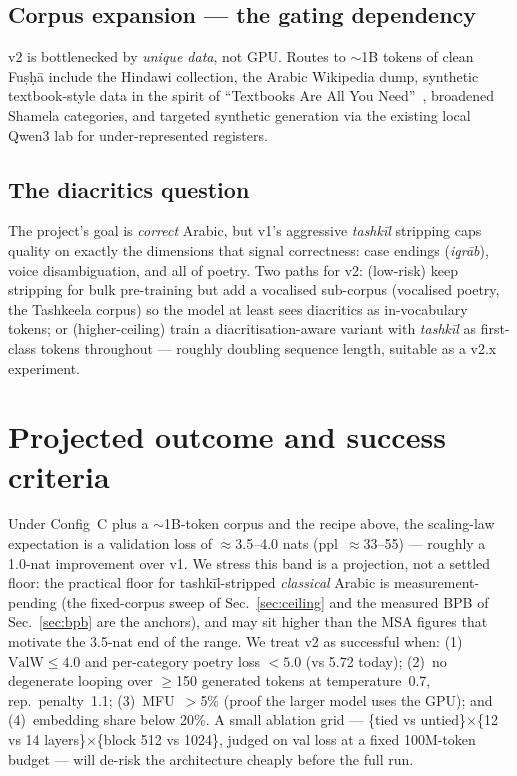 \documentclass[10pt,twocolumn]{article}
\begin{document}
\subsection{Corpus expansion --- the gating dependency}
v2 is bottlenecked by \emph{unique data}, not GPU. Routes to $\sim$1B tokens of
clean Fu\d{s}\d{h}\=a include the Hindawi collection, the Arabic Wikipedia dump,
synthetic textbook-style data in the spirit of ``Textbooks Are All You
Need''~\cite{textbooks}, broadened Shamela categories, and targeted synthetic
generation via the existing local Qwen3 lab for under-represented registers.

\subsection{The diacritics question}
\label{sec:diacritics}
The project's goal is \emph{correct} Arabic, but v1's aggressive
\emph{tashk\=il} stripping caps quality on exactly the dimensions that signal
correctness: case endings (\emph{i\d{q}r\=ab}), voice disambiguation, and all of
poetry. Two paths for v2: (low-risk) keep stripping for bulk pre-training but add
a vocalised sub-corpus (vocalised poetry, the Tashkeela corpus) so the model at
least sees diacritics as in-vocabulary tokens; or (higher-ceiling) train a
diacritisation-aware variant with \emph{tashk\=il} as first-class tokens
throughout --- roughly doubling sequence length, suitable as a v2.x experiment.

\section{Projected outcome and success criteria}
Under Config~C plus a $\sim$1B-token corpus and the recipe above, the scaling-law
expectation is a validation loss of $\approx$3.5--4.0 nats (ppl~$\approx$33--55)
--- roughly a 1.0-nat improvement over v1. We stress this band is a projection, not a
settled floor: the practical floor for tashk\=il-stripped \emph{classical} Arabic is
measurement-pending (the fixed-corpus sweep of Sec.~\ref{sec:ceiling} and the measured
BPB of Sec.~\ref{sec:bpb} are the anchors), and may sit higher than the MSA figures
that motivate the 3.5-nat end of the range. We treat v2 as successful when:
(1)~$\text{ValW}\leq4.0$ and per-category poetry loss $<5.0$ (vs 5.72 today);
(2)~no degenerate looping over $\geq$150 generated tokens at temperature~0.7,
rep.\ penalty~1.1; (3)~MFU~$>$5\% (proof the larger model uses the GPU); and
(4)~embedding share below 20\%. A small ablation grid ---
\{tied vs untied\}$\times$\{12 vs 14 layers\}$\times$\{block 512 vs 1024\},
judged on val loss at a fixed 100M-token budget --- will de-risk the architecture
cheaply before the full run.
\end{document}
